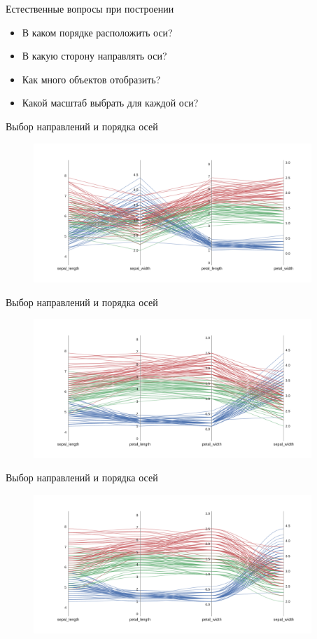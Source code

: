 \documentclass[fleqn, xcolor=x11names]{beamer}
\begin{document}
\begin{frame}{Естественные вопросы при построении}
    \begin{itemize}
        \item В каком порядке расположить оси?
        \item В какую сторону направлять оси?
        \item Как много объектов отобразить?
        \item Какой масштаб выбрать для каждой оси?
    \end{itemize}
\end{frame}

\begin{frame}{Выбор направлений и порядка осей}
    \begin{figure}[htb]
        \centering
        \includegraphics[width=10.5cm]{upgrade_1.pdf}
    \end{figure}
\end{frame}

\begin{frame}{Выбор направлений и порядка осей}
    \begin{figure}[htb]
        \centering
        \includegraphics[width=10.5cm]{upgrade_2.pdf}
    \end{figure}
\end{frame}

\begin{frame}{Выбор направлений и порядка осей}
    \begin{figure}[htb]
        \centering
        \includegraphics[width=10.5cm]{upgrade_3.pdf}
    \end{figure}
\end{frame}
\end{document}

